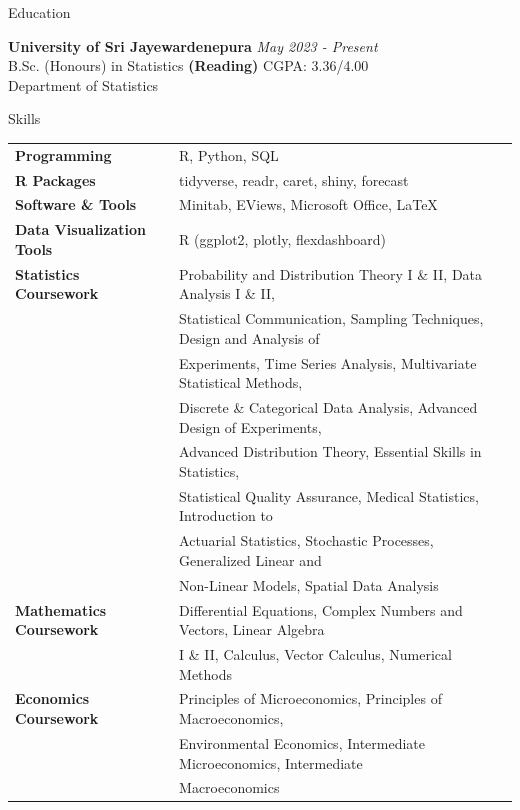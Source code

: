 \documentclass{resume} %
\begin{document}

\begin{rSection}{Education}

{\bf University of Sri Jayewardenepura} \hfill {\em May 2023 - Present} 
\\ B.Sc. (Honours) in Statistics \textbf{(Reading)} \hfill { CGPA: 3.36/4.00}
\\ Department of Statistics \\

\end{rSection}

\begin{rSection}{Skills}
\begin{tabular}{ @{} >{\bfseries}l @{\hspace{6ex}} l }
Programming & R, Python, SQL \\
R Packages & tidyverse, readr, caret, shiny, forecast \\
Software \& Tools & Minitab, EViews, Microsoft Office, \LaTeX \\
Data Visualization Tools & R (ggplot2, plotly, flexdashboard)\\
Statistics Coursework & Probability and Distribution Theory I \& II, Data Analysis I \& II, \\
& Statistical Communication, Sampling Techniques, Design and Analysis of \\
& Experiments, Time Series Analysis, Multivariate Statistical Methods, \\
& Discrete \& Categorical Data Analysis, Advanced Design of Experiments, \\
& Advanced Distribution Theory, Essential Skills in Statistics, \\
& Statistical Quality Assurance, Medical Statistics, Introduction to \\
& Actuarial Statistics, Stochastic Processes, Generalized Linear and \\
& Non-Linear Models, Spatial Data Analysis \\
Mathematics Coursework & Differential Equations, Complex Numbers and Vectors, Linear Algebra \\
& I \& II, Calculus, Vector Calculus, Numerical Methods \\
Economics Coursework & Principles of Microeconomics, Principles of Macroeconomics, \\
& Environmental Economics, Intermediate Microeconomics, Intermediate \\
& Macroeconomics \\
\end{tabular}
\end{rSection}
\end{document}

